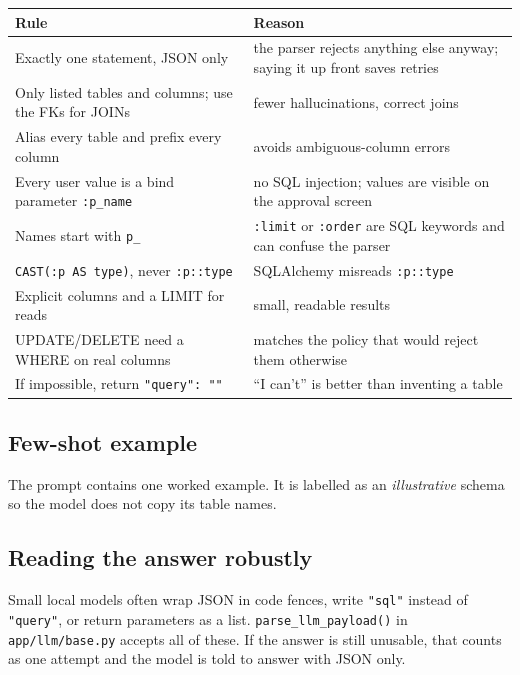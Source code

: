 \documentclass[11pt,a4paper]{article}
\begin{document}
\begin{center}
\begin{tabular}{@{}p{6.4cm}p{8.2cm}@{}}
\toprule
\textbf{Rule} & \textbf{Reason} \\
\midrule
Exactly one statement, JSON only & the parser rejects anything else anyway; saying it up front saves retries \\
Only listed tables and columns; use the FKs for JOINs & fewer hallucinations, correct joins \\
Alias every table and prefix every column & avoids ambiguous-column errors \\
Every user value is a bind parameter \texttt{:p\_name} & no SQL injection; values are visible on the approval screen \\
Names start with \texttt{p\_} & \texttt{:limit} or \texttt{:order} are SQL keywords and can confuse the parser \\
\texttt{CAST(:p AS type)}, never \texttt{:p::type} & SQLAlchemy misreads \texttt{:p::type} \\
Explicit columns and a LIMIT for reads & small, readable results \\
UPDATE/DELETE need a WHERE on real columns & matches the policy that would reject them otherwise \\
If impossible, return \texttt{"query": ""} & ``I can't'' is better than inventing a table \\
\bottomrule
\end{tabular}
\end{center}

\subsection*{Few-shot example}
The prompt contains one worked example. It is labelled as an
\emph{illustrative} schema so the model does not copy its table names.

\subsection*{Reading the answer robustly}
Small local models often wrap JSON in code fences, write \texttt{"sql"}
instead of \texttt{"query"}, or return parameters as a list.
\texttt{parse\_llm\_payload()} in \texttt{app/llm/base.py} accepts all of
these. If the answer is still unusable, that counts as one attempt and the
model is told to answer with JSON only.
\end{document}
